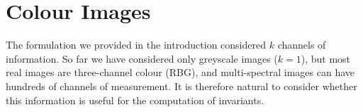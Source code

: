 \documentclass[review,onefignum,onetabnum]{siamonline190516}
\def\R{\mathbb{R}}
\begin{document}





\section{Colour Images}\label{sec:colour}

The formulation we provided in the introduction considered $k$ channels of information. So far we have considered only greyscale images ($k=1$), but most real images are three-channel colour (RBG), and multi-spectral images can have hundreds of channels of measurement. It is therefore natural to consider whether this information is useful for the computation of invariants. 
\end{document}
